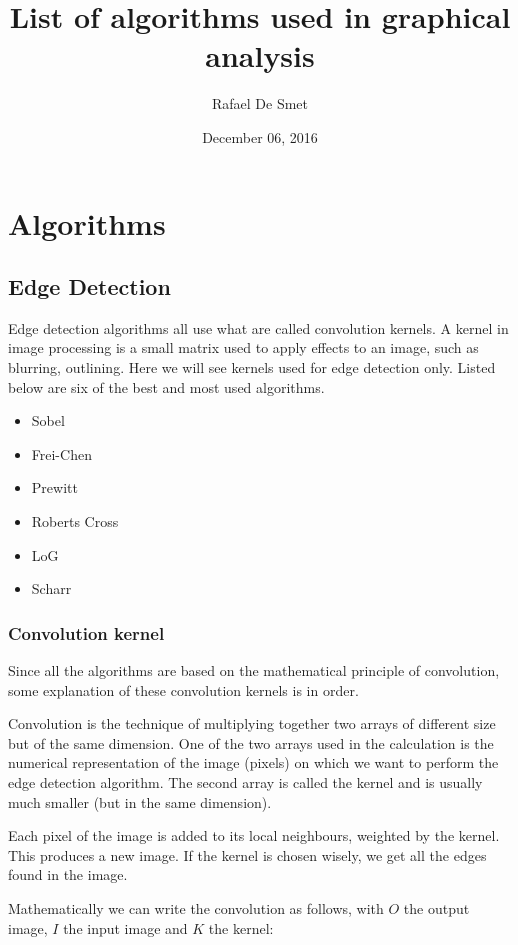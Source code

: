 \documentclass[12pt]{article}
\begin{document}
\title{List of algorithms used in graphical analysis}
\date{December 06, 2016}
\author{Rafael De Smet}

\maketitle

\section{Algorithms}
\subsection{Edge Detection}

Edge detection algorithms all use what are called convolution kernels. A kernel in image processing is a small matrix used to apply effects to an image, such as blurring, outlining. Here we will see kernels used for edge detection only. Listed below are six of the best and most used algorithms.

\begin{itemize}
	\item Sobel 
	\item Frei-Chen
	\item Prewitt
	\item Roberts Cross
	\item LoG
	\item Scharr
\end{itemize}

\subsubsection{Convolution kernel}
Since all the algorithms are based on the mathematical principle of convolution, some explanation of these convolution kernels is in order. 

Convolution is the technique of multiplying together two arrays of different size but of the same dimension. One of the two arrays used in the calculation is the numerical representation of the image (pixels) on which we want to perform the edge detection algorithm. The second array is called the kernel and is usually much smaller (but in the same dimension).

Each pixel of the image is added to its local neighbours, weighted by the kernel. This produces a new image. If the kernel is chosen wisely, we get all the edges found in the image.

Mathematically we can write the convolution as follows, with $O$ the output image, $I$ the input image and $K$ the kernel:
\end{document}
